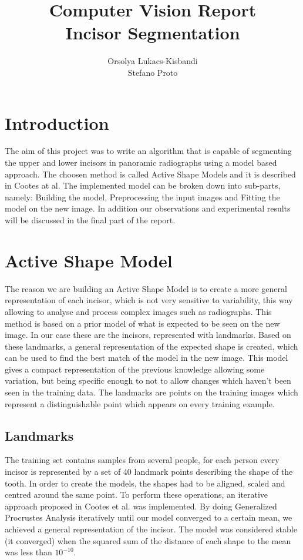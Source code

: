 \documentclass{article}
\begin{document}
\author{Orsolya Lukacs-Kisbandi \\ Stefano Proto}
\title{%
  \textbf{Computer Vision Report } \\
   Incisor Segmentation }

\maketitle

\section{Introduction}

The aim of this project was to write  an  algorithm  that  is  capable  of  segmenting  the upper and lower incisors in panoramic radiographs  using  a  model  based  approach. The choosen method is called Active Shape Models and it is described in \cite{cootes} Cootes at al. The implemented model can be broken down into sub-parts, namely: Building the model, Preprocessing the input images and Fitting the model on the new image. In addition our observations and experimental results will be discussed in the final part of the report. 

\section{Active Shape Model}

The reason we are building an Active Shape Model is to create a more general representation of each incisor, which is not very sensitive to variability, this way allowing to analyse and process complex images such as radiographs. This method is based on a prior model of what is expected to be seen on the new image. In our case these are the incisors, represented with landmarks. Based on these landmarks, a general representation of the expected shape is created, which can be used to find the best match of the model in the new image. This model gives a compact representation of the previous knowledge allowing some variation, but being specific enough to not to allow changes which haven't been seen in the training data. The landmarks are points on the training images which represent a distinguishable point which appears on every training example.

\subsection{ Landmarks } %
The training set contains samples from several people, for each person every incisor is represented by a set of 40 landmark points describing the shape of the tooth. In order to create the models, the shapes had to be aligned, scaled and centred around the same point. To perform these operations, an iterative approach proposed in \cite{cootes} Cootes et al. was implemented. By doing Generalized Procrustes Analysis iteratively until our model converged to a certain mean, we achieved a general representation of the incisor. The model was considered stable (it converged) when the squared sum of the distance of each shape to the mean was less than $10^{-10}$.
\end{document}

